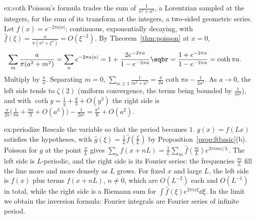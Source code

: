 \begin{solution}{ex:coth}
\idea Poisson's formula trades the sum of $\frac1{n^2+a^2}$, a Lorentzian sampled at the integers, for the sum of its transform at the
integers, a two-sided geometric series.
\writeup Let $f(x)=e^{-2\pi a|x|}$: continuous, exponentially decaying, with $\hat f(\xi)=\frac a{\pi(a^2+\xi^2)}=O(\xi^{-2})$. By Theorem~\ref{thm:poisson} at $x=0$,
\[
\begin{aligned}\sum_m\frac a{\pi(a^2+m^2)}&=\sum_ne^{-2\pi a|n|}=1+\frac{2e^{-2\pi a}}{1-e^{-2\pi a}}\eqbr=\frac{1+e^{-2\pi a}}{1-e^{-2\pi a}}=\coth\pi a.\end{aligned}
\]
Multiply by $\frac\pi a$. Separating $m=0$, $\sum_{m\ge1}\frac1{m^2+a^2}=\frac\pi{2a}\coth\pi a-\frac1{2a^2}$. As $a\to0$, the left side tends to $\zeta(2)$ (uniform convergence,
the terms being bounded by $\frac1{m^2}$), and with $\coth y=\frac1y+\frac y3+O(y^3)$ the right side is $\frac\pi{2a}\bigl(\frac1{\pi a}+\frac{\pi a}3+O(a^3)\bigr)-\frac1{2a^2}=\frac{\pi^2}6+O(a^2)$.
\end{solution}

\begin{solution}{ex:periodize}
\idea Rescale the variable so that the period becomes $1$.
\writeup $g(x)=f(Lx)$ satisfies the hypotheses, with $\hat g(\xi)=\frac1L\hat f(\frac\xi L)$ by Proposition~\ref{prop:ftbasic}(b). Poisson for $g$ at the point $\frac xL$ gives
$\sum_nf(x+nL)=\frac1L\sum_m\hat f(\frac mL)e^{2\pi imx/L}$. The left side is $L$-periodic, and the right side is its Fourier series: the frequencies
$\frac mL$ fill the line more and more densely as $L$ grows. For fixed $x$ and large $L$, the left side is $f(x)$ plus terms $f(x+nL)$, $n\ne0$,
which are $O(L^{-2})$ each and $O(L^{-1})$ in total, while the right side is a Riemann sum for $\int\hat f(\xi)e^{2\pi ix\xi}\dd\xi$. In the limit we obtain the
inversion formula: Fourier integrals are Fourier series of infinite period.
\end{solution}

